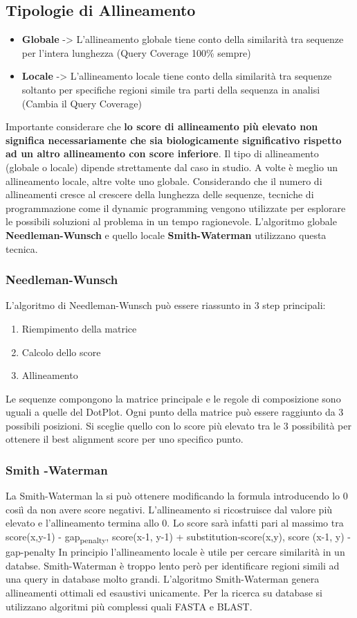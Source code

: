 \documentclass[11pt]{article}
\begin{document}
\subsection{Tipologie di Allineamento}
\label{sec:org255f089}
\begin{itemize}
\item \textbf{Globale} -> L'allineamento globale tiene conto della similarità tra sequenze per l'intera lunghezza (Query Coverage 100\% sempre)
\item \textbf{Locale} -> L'allineamento locale tiene conto della similarità tra sequenze soltanto per specifiche regioni simile tra parti della sequenza in analisi (Cambia il Query Coverage)
\end{itemize}
Importante considerare che \textbf{lo score di allineamento più elevato non significa necessariamente che sia biologicamente significativo rispetto ad un altro allineamento con score inferiore}.
Il tipo di allineamento (globale o locale) dipende strettamente dal caso in studio. A volte è meglio un allineamento locale, altre volte uno globale.
Considerando che il numero di allineamenti cresce al crescere della lunghezza delle sequenze, tecniche di programmazione come il dynamic programming vengono utilizzate per esplorare le possibili soluzioni al problema in un tempo ragionevole.
L'algoritmo globale \textbf{Needleman-Wunsch} e quello locale \textbf{Smith-Waterman} utilizzano questa tecnica.
\subsubsection{Needleman-Wunsch}
\label{sec:org9f1865a}
L'algoritmo di Needleman-Wunsch può essere riassunto in 3 step principali:
\begin{enumerate}
\item Riempimento della matrice
\item Calcolo dello score
\item Allineamento
\end{enumerate}
Le sequenze compongono la matrice principale e le regole di composizione sono uguali a quelle del DotPlot.
Ogni punto della matrice può essere raggiunto da 3 possibili posizioni. Si sceglie quello con lo score più elevato tra le 3 possibilità per ottenere il best alignment score per uno specifico punto.
\subsubsection{Smith -Waterman}
\label{sec:org2b76f64}
La Smith-Waterman la si può ottenere modificando la formula introducendo lo 0 cosiì da non avere score negativi.
L'allineamento si ricostruisce dal valore più elevato e l'allineamento termina allo 0.
Lo score sarà infatti pari al massimo tra score(x,y-1) - gap\textsubscript{penalty}, score(x-1, y-1) + substitution-score(x,y), score (x-1, y) - gap-penalty
In principio l'allineamento locale è utile per cercare similarità in un databse. Smith-Waterman è troppo lento però per identificare regioni simili ad una query in database molto grandi. L'algoritmo Smith-Waterman genera allineamenti ottimali ed esaustivi unicamente.
Per la ricerca su database si utilizzano algoritmi più complessi quali FASTA e BLAST.
\end{document}
